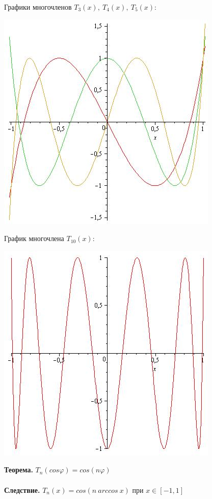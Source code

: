\documentclass[12pt]{article}
\theoremstyle{definition}
\numberwithin{equation}{section}
\begin{document}
	Графики многочленов $T_3(x),~ T_4(x),~ T_5(x)$:\begin{center}
		\includegraphics[scale=0.5]{T3T4T5.jpg} \end{center}	
	График многочлена $T_{10}(x)$:\begin{center}
		\includegraphics[scale=0.5]{T10.jpg} \end{center} 
	\textbf{Теорема.}
	$T_n(cos \varphi)=cos(n\varphi)$\\
	\\
	\textbf{Следствие.}
	$T_n(x)=cos(n ~ arccos~x)$ при $ x \in [-1, 1]$\\
	\\
\end{document}
